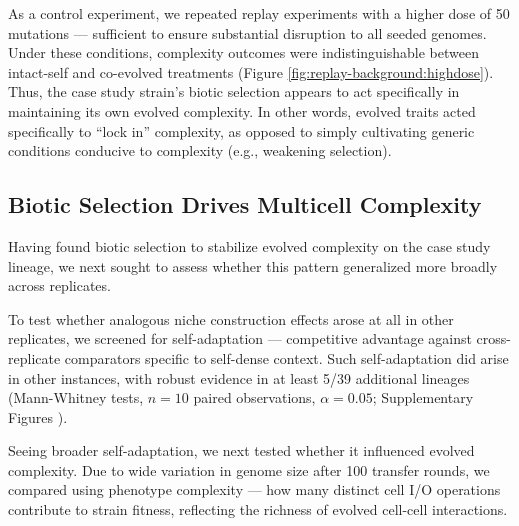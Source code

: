 As a control experiment, we repeated replay experiments with a higher dose of 50 mutations --- sufficient to ensure substantial disruption to all seeded genomes.
Under these conditions, complexity outcomes were indistinguishable between intact-self and co-evolved treatments (Figure \ref{fig:replay-background:highdose}).
Thus, the case study strain's biotic selection appears to act specifically in maintaining its own evolved complexity.
In other words, evolved traits acted specifically to ``lock in'' complexity, as opposed to simply cultivating generic conditions conducive to complexity (e.g., weakening selection).


\subsection{Biotic Selection Drives Multicell Complexity}
\label{sec:biotic-selection-drives-multicell-complexity}



Having found biotic selection to stabilize evolved complexity on the case study lineage, we next sought to assess whether this pattern generalized more broadly across replicates.

To test whether analogous niche construction effects arose at all in other replicates, we screened for self-adaptation --- competitive advantage against cross-replicate comparators specific to self-dense context.
Such self-adaptation did arise in other instances, with robust evidence in at least 5/39 additional lineages (Mann-Whitney tests, $n=10$ paired observations, $\alpha = 0.05$; Supplementary Figures ).

Seeing broader self-adaptation, we next tested whether it influenced evolved complexity.
Due to wide variation in genome size after 100 transfer rounds, we compared using phenotype complexity --- how many distinct cell I/O operations contribute to strain fitness, reflecting the richness of evolved cell-cell interactions.

